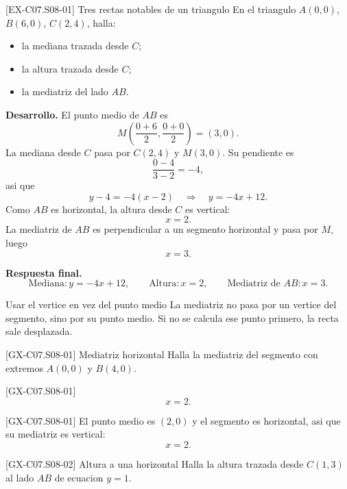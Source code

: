 \begin{solvedexample}{[EX-C07.S08-01] Tres rectas notables de un triangulo}
En el triangulo \(A(0,0)\), \(B(6,0)\), \(C(2,4)\), halla:
\begin{itemize}
  \item la mediana trazada desde \(C\);
  \item la altura trazada desde \(C\);
  \item la mediatriz del lado \(AB\).
\end{itemize}

\textbf{Desarrollo.} El punto medio de \(AB\) es
\[
M\left(\frac{0+6}{2},\frac{0+0}{2}\right)=(3,0).
\]
La mediana desde \(C\) pasa por \(C(2,4)\) y \(M(3,0)\). Su pendiente es
\[
\frac{0-4}{3-2}=-4,
\]
asi que
\[
y-4=-4(x-2)
\quad \Longrightarrow \quad
y=-4x+12.
\]
Como \(AB\) es horizontal, la altura desde \(C\) es vertical:
\[
x=2.
\]
La mediatriz de \(AB\) es perpendicular a un segmento horizontal y pasa por \(M\), luego
\[
x=3.
\]

\textbf{Respuesta final.}
\[
\text{Mediana}: y=-4x+12,
\qquad
\text{Altura}: x=2,
\qquad
\text{Mediatriz de } AB: x=3.
\]
\end{solvedexample}

\begin{commonerror}{Usar el vertice en vez del punto medio}
La mediatriz no pasa por un vertice del segmento, sino por su punto medio. Si no se calcula ese
punto primero, la recta sale desplazada.
\end{commonerror}

\begin{guidedexercise}{[GX-C07.S08-01] Mediatriz horizontal}
Halla la mediatriz del segmento con extremos \(A(0,0)\) y \(B(4,0)\).
\end{guidedexercise}

\begin{shortanswer}{[GX-C07.S08-01]}
\[
x=2.
\]
\end{shortanswer}

\begin{fullsolution}{[GX-C07.S08-01]}
El punto medio es \((2,0)\) y el segmento es horizontal, asi que su mediatriz es vertical:
\[
x=2.
\]
\end{fullsolution}

\begin{guidedexercise}{[GX-C07.S08-02] Altura a una horizontal}
Halla la altura trazada desde \(C(1,3)\) al lado \(AB\) de ecuacion \(y=1\).
\end{guidedexercise}

